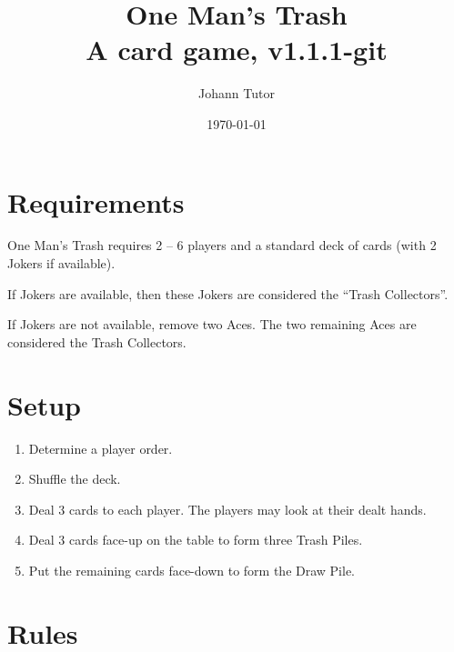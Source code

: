 \documentclass{article}
\newcommand\theversion{1.1.1-git}
\newcommand\thegame{One Man's Trash}
\begin{document}
\title{\thegame{}\\ \large A card game, v\theversion}
\author{Johann Tutor}
\date{\today}
\maketitle


\tableofcontents

\newpage

\section{Requirements \label{sec:requirements}}

\thegame{} requires 2 -- 6 players and a standard deck of cards (with 2 Jokers if available).

If Jokers are available, then these Jokers are considered the ``Trash Collectors''.

If Jokers are not available, remove two Aces.
The two remaining Aces are considered the Trash Collectors.

\section{Setup \label{sec:setup}}

\begin{enumerate}
  \item Determine a player order.
  \item Shuffle the deck.
  \item Deal 3 cards to each player. The players may look at their dealt hands.
  \item Deal 3 cards face-up on the table to form three Trash Piles.
  \item Put the remaining cards face-down to form the Draw Pile.
\end{enumerate}

\section{Rules \label{sec:rules}}
\end{document}
